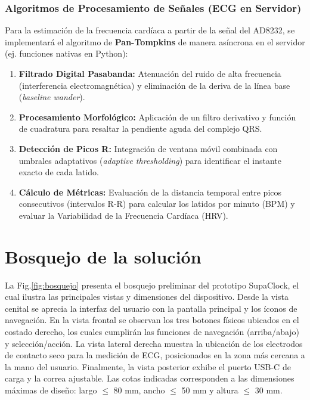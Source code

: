 \documentclass[letterpaper,11pt]{article}
\newcommand{\rfigura}[1]{Fig.\ref{#1}}
\begin{document}
\subsubsection{Algoritmos de Procesamiento de Señales (ECG en Servidor)}
Para la estimación de la frecuencia cardíaca a partir de la señal del AD8232, se implementará el algoritmo de \textbf{Pan-Tompkins} de manera asíncrona en el servidor (ej. funciones nativas en Python):
\begin{enumerate}
    \item \textbf{Filtrado Digital Pasabanda:} Atenuación del ruido de alta frecuencia (interferencia electromagnética) y eliminación de la deriva de la línea base (\textit{baseline wander}).
    \item \textbf{Procesamiento Morfológico:} Aplicación de un filtro derivativo y función de cuadratura para resaltar la pendiente aguda del complejo QRS.
    \item \textbf{Detección de Picos R:} Integración de ventana móvil combinada con umbrales adaptativos (\textit{adaptive thresholding}) para identificar el instante exacto de cada latido.
    \item \textbf{Cálculo de Métricas:} Evaluación de la distancia temporal entre picos consecutivos (intervalos R-R) para calcular los latidos por minuto (BPM) y evaluar la Variabilidad de la Frecuencia Cardíaca (HRV).
\end{enumerate}


\section{Bosquejo de la solución}

La \rfigura{fig:bosquejo} presenta el bosquejo preliminar del prototipo SupaClock, el cual ilustra las principales vistas y dimensiones del dispositivo. Desde la vista cenital se aprecia la interfaz del usuario con la pantalla principal y los íconos de navegación. En la vista frontal se observan los tres botones físicos ubicados en el costado derecho, los cuales cumplirán las funciones de navegación (arriba/abajo) y selección/acción. La vista lateral derecha muestra la ubicación de los electrodos de contacto seco para la medición de ECG, posicionados en la zona más cercana a la mano del usuario. Finalmente, la vista posterior exhibe el puerto USB-C de carga y la correa ajustable. Las cotas indicadas corresponden a las dimensiones máximas de diseño: largo $\leq$ 80 mm, ancho $\leq$ 50 mm y altura $\leq$ 30 mm.
\end{document}
